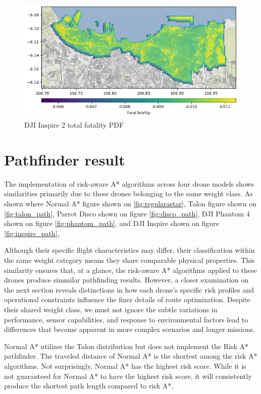 \documentclass[12pt]{report}
\begin{document}
        \begin{figure}[H]
            \centering
            \includegraphics[width=\textwidth]{Plot/inspire/total_fatality_pdf.png}
            \caption{DJI Inspire 2 total fatality PDF}
            \label{fig:inspire_fatal}
        \end{figure}

    \section{Pathfinder result}
        The implementation of risk-aware A* algorithms across four drone models shows similarities primarily due to
        these drones belonging to the same weight class. As shown where Normal A* figure shown on
        \ref{fig:regularastar}, Talon figure shown on \ref{fig:talon_path}, Parrot Disco shown on figure
        \ref{fig:disco_path}, DJI Phantom 4 shown on figure \ref{fig:phantom_path}, and DJI Inspire shown on figure
        \ref{fig:inspire_path}, 
        
        Although their specific flight characteristics may differ, their classification within the same weight category
        means they share comparable physical properties. This similarity ensures that, at a glance, the risk-aware A*
        algorithms applied to these drones produce simmilar pathfinding results. However, a closer examination on the
        next section reveals distinctions in how each drone's specific risk profiles and operational constraints
        influence the finer details of route optimization. Despite their shared weight class, we must not ignore the
        subtle variations in performance, sensor capabilities, and response to environmental factors lead to differences
        that become apparent in more complex scenarios and longer missions.

        Normal A* utilizes the Talon distribution but does not implement the Risk A* pathfinder. The traveled distance
        of Normal A* is the shortest among the risk A* algorithms. Not surprisingly, Normal A* has the highest risk
        score. While it is not guaranteed for Normal A* to have the highest risk score, it will consistently produce the
        shortest path length compared to risk A*.
        
\end{document}
